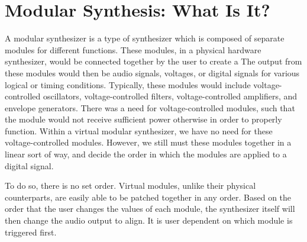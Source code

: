 \section[Modular Synthesis: What Is It?]{Modular Synthesis: What Is It?}\label{section:modular-synth-what-is}

A modular synthesizer is a type of synthesizer which is composed of separate modules for different functions. These modules, in a physical hardware synthesizer, would be connected together by the user to create a  The output from these modules would then be audio signals, voltages, or digital signals for various logical or timing conditions. Typically, these modules would include voltage-controlled oscillators, voltage-controlled filters, voltage-controlled amplifiers, and envelope generators. There was a need for voltage-controlled modules, such that the module would not receive sufficient power otherwise in order to properly function. Within a virtual modular synthesizer, we have no need for these voltage-controlled modules. However, we still must  these modules together in a linear sort of way, and decide the order in which the modules are applied to a digital signal. 

To do so, there is no set order. Virtual modules, unlike their physical counterparts, are easily able to be patched together in any order. Based on the order that the user changes the values of each module, the synthesizer itself will then change the audio output to align. It is user dependent on which module is triggered first.


